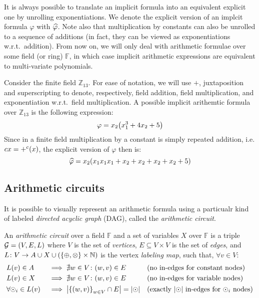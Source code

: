 It is always possible to translate an implicit formula into an equivalent explicit one by unrolling 
exponentiations.
We denote the explicit version of an implcit formula \(\varphi \) with \(\explicit{\varphi}\).
Note also that multiplication by constants can also be unrolled to a sequence of additions 
(in fact, they can be viewed as exponentiations w.r.t.\ addition).
From now on, we will only deal with arithmetic formulae over some field (or ring) \(\mathbb{F}\), 
in which case implicit arithmetic expressions are equivalent to multi-variate polynomials.
\begin{example}\label{ex:arithmetic_formula}
  Consider the finite field \(\mathbb{Z}_{13}\).
  For ease of notation, we will use \(+\), juxtaposition and superscripting to denote, respectively,
  field addition, field multiplication, and exponentiation w.r.t.\ field multiplication. 
  A possible implicit arithemtic formula over \(\mathbb{Z}_{13}\) is the following expression:
  \[\varphi = x_{2}\Parens*{x_{1}^{3} + 4x_{2} + 5}\]
  Since in a finite field multiplication by a constant is simply repeated addition, i.e. 
  \(cx = \call{+^{c}}{x}\), the explicit version of \(\varphi \) then is:
  \[\explicit{\varphi} = x_{2}\Parens*{x_{1}x_{1}x_{1} + x_{2} + x_{2} + x_{2} + x_{2} + 5}\]
\end{example} 

\subsection{Arithmetic circuits}
It is possible to visually represent an arithmetic formula using a particualr kind of labeled 
\emph{directed acyclic graph} (DAG), called the \emph{arithmetic circuit}.
\begin{definition}
  An \emph{arithmetic circuit} over a field \(\mathbb{F}\) and a set of variables \(X\) over 
  \(\mathbb{F}\) is a triple \(\mathcal{G} = \Tuple{V, E, L}\) where 
  \(V\) is the set of \emph{vertices}, \(E \subseteq V \times V\) is the set of \emph{edges}, and 
  \(L\colon V \to A \cup X \cup \Parens*{\Set{\oplus, \otimes} \times \mathbb{N}}\) is 
  the vertex \emph{labeling map}, such that, \(\forall v \in V\):
  \begin{align*}
    & \call{L}{v} \in A && \implies \nexists w \in V\colon \Tuple{w, v} \in E
    && \textnormal{(no in-edges for constant nodes)} \\
    & \call{L}{v} \in X && \implies \nexists w \in V\colon \Tuple{w, v} \in E
    && \textnormal{(no in-edges for variable nodes)} \\
    & \forall \odot_i \in \call{L}{v} && \implies \abs{\Set{\Tuple{w, v}}_{w \in V} \cap E} = 
    \abs{\odot} && \textnormal{(exactly \(\abs{\odot}\) in-edges for \(\odot_i\) nodes)} \\
  \end{align*}
\end{definition}

